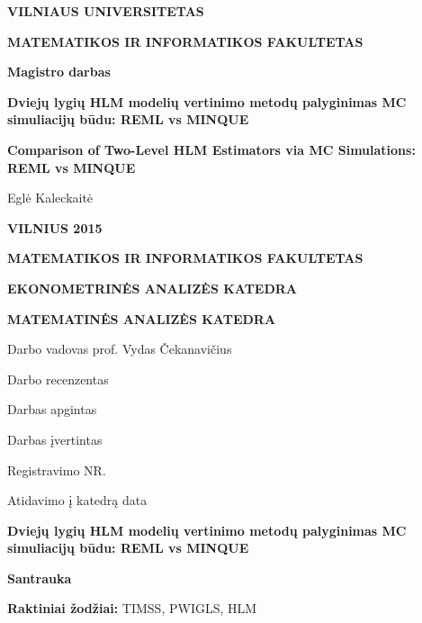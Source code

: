 \documentclass[12pt,a4paper]{article}
\begin{document}
\begin{titlepage}
\vskip 20pt
\centerline{\bf \large VILNIAUS UNIVERSITETAS}
\bigskip
\centerline{\large \textbf{MATEMATIKOS IR INFORMATIKOS FAKULTETAS}}

\vskip 120pt
\centerline{\bf \Large \textbf{Magistro darbas}}
\vskip 50pt
\begin{center}
{\bf \LARGE Dviejų lygių HLM modelių vertinimo metodų palyginimas MC simuliacijų būdu: REML vs MINQUE}
\end{center}
\bigskip
\begin{center}
{\bf \Large Comparison of Two-Level HLM Estimators via MC Simulations: REML vs MINQUE}
\end{center}
\bigskip
\centerline{\Large Eglė Kaleckaitė }
\vskip 90pt
\vskip 120pt
\centerline{\large \textbf{VILNIUS 2015}}
\end{titlepage}
\begin{titlepage}
\centerline {\bf \large MATEMATIKOS IR INFORMATIKOS FAKULTETAS}
\centerline {\bf EKONOMETRINĖS ANALIZĖS KATEDRA}
\centerline {\bf MATEMATINĖS ANALIZĖS KATEDRA}

\vskip 120pt
\large Darbo vadovas prof. Vydas Čekanavičius

\large Darbo recenzentas \underline{\hskip 265pt}
\vskip 150pt

{\large Darbas apgintas \underline{\hskip 98pt }}

\large Darbas įvertintas \underline{\hskip 94pt }

\vskip 120pt

{\large Registravimo NR. \underline{\hskip 95pt }

Atidavimo į katedrą data \underline{\hskip 135pt} }

\end{titlepage}

\newpage
\pagestyle{plain}
\tableofcontents

\newpage

\begin{center}{\large\textbf{Dviejų lygių HLM modelių vertinimo metodų palyginimas MC simuliacijų būdu: REML vs MINQUE}}\end{center}

\begin{small}
\vspace{2\baselineskip}
\begin{center}\textbf{Santrauka}\end{center}


\vspace{\baselineskip}

\noindent\textbf{Raktiniai žodžiai:}
TIMSS, PWIGLS, HLM
\end{small}
\vspace{\baselineskip}
\thispagestyle{empty}
\end{document}
